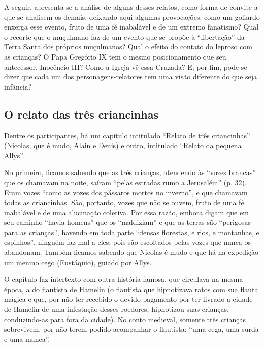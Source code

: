 \documentclass[12pt]{extarticle}
\begin{document}
A seguir, apresenta-se a análise de alguns desses relatos, como forma de
convite a que se analisem os demais, deixando aqui algumas provocações:
como um goliardo enxerga esse evento, fruto de uma fé inabalável e de um
extremo fanatismo? Qual o recorte que o muçulmano faz de um evento que
se propõe à ``libertação'' da Terra Santa dos próprios muçulmanos? Qual
o efeito do contato do leproso com as crianças? O Papa Gregório IX tem o
mesmo posicionamento que seu antecessor, Inocêncio III? Como a Igreja vê
essa Cruzada? E, por fim, pode-se dizer que cada um dos
personagens-relatores tem uma visão diferente do que seja infância?

\subsection{O relato das três criancinhas}

Dentre os participantes, há um capítulo intitulado ``Relato de três
criancinhas'' (Nicolas, que é mudo, Alain e Denis) e outro, intitulado
``Relato da pequena Allys''.

No primeiro, ficamos sabendo que as três crianças, atendendo às ``vozes
brancas'' que os chamavam na noite, saíram ``pelas estradas rumo a
Jerusalém'' (p. 32). Eram vozes ``como as vozes dos pássaros mortos no
inverno'', e que chamavam todas as criancinhas. São, portanto, vozes que
não se ouvem, fruto de uma fé inabalável e de uma alucinação coletiva.
Por essa razão, embora digam que em seu caminho ``havia homens'' que os
``maldiziam'' e que as terras são ``perigosas para as crianças'',
havendo em toda parte ``densas florestas, e rios, e montanhas, e
espinhos'', ninguém faz mal a eles, pois são escoltados pelas vozes que
nunca os abandonam. Também ficamos sabendo que Nicolas é mudo e que há
na expedição um menino cego (Eustáquio), guiado por Allys.

O capítulo faz intertexto com outra história famosa, que circulava na
mesma época, a do flautista de Hamelin (o flautista que hipnotizava
ratos com sua flauta mágica e que, por não ter recebido o devido
pagamento por ter livrado a cidade de Hamelin de uma infestação desses
roedores, hipnotizou suas crianças, conduzindo-as para fora da cidade).
No conto medieval, somente três crianças sobrevivem, por não terem
podido acompanhar o flautista: ``uma cega, uma surda e uma manca''.


\end{document}
